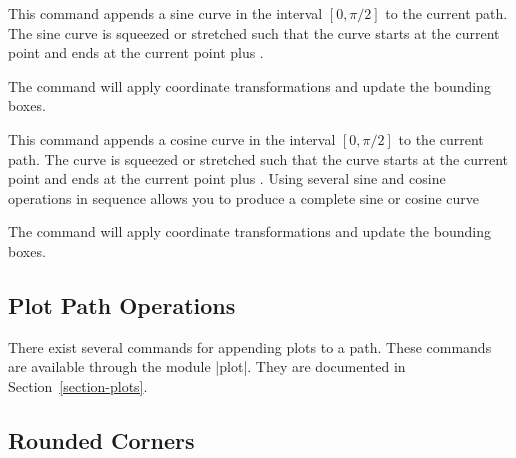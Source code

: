 \begin{command}{\pgfpathsine{}}
  This command appends a sine curve in the interval $[0,\pi/2]$ to the
  current path. The sine curve is squeezed or stretched such that the
  curve starts at the current point and ends at the current point plus
  .
\begin{codeexample}[]
\end{codeexample}
  The command will apply coordinate transformations and update the
  bounding boxes.
\end{command}

\begin{command}{\pgfpathcosine{}}
  This command appends a cosine curve in the interval $[0,\pi/2]$ to the
  current path. The curve is squeezed or stretched such that the
  curve starts at the current point and ends at the current point plus
  . Using several sine and cosine operations in sequence
  allows you to produce a complete sine or cosine curve
\begin{codeexample}[]
\begin{pgfpicture}
  \pgfpathmoveto{\pgfpoint{0cm}{0cm}}
  \pgfpathsine{\pgfpoint{1cm}{1cm}}
  \pgfpathcosine{\pgfpoint{1cm}{-1cm}}
  \pgfpathsine{\pgfpoint{1cm}{-1cm}}
  \pgfpathcosine{\pgfpoint{1cm}{1cm}}
\end{pgfpicture}
\end{codeexample}
  The command will apply coordinate transformations and update the
  bounding boxes.
\end{command}



\subsection{Plot Path Operations}

There exist several commands for appending
plots to a path. These
commands are available through the module |plot|. They are
documented in Section~\ref{section-plots}.


\subsection{Rounded Corners}

